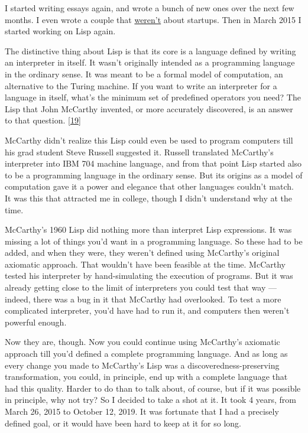 I started writing essays again, and wrote a bunch of new ones over the
next few months. I even wrote a couple that \href{know.html}{weren't}
about startups. Then in March 2015 I started working on Lisp again.

The distinctive thing about Lisp is that its core is a language defined
by writing an interpreter in itself. It wasn't originally intended as a
programming language in the ordinary sense. It was meant to be a formal
model of computation, an alternative to the Turing machine. If you want
to write an interpreter for a language in itself, what's the minimum set
of predefined operators you need? The Lisp that John McCarthy invented,
or more accurately discovered, is an answer to that question.
{[}\hyperref[f19n]{19}{]}

McCarthy didn't realize this Lisp could even be used to program
computers till his grad student Steve Russell suggested it. Russell
translated McCarthy's interpreter into IBM 704 machine language, and
from that point Lisp started also to be a programming language in the
ordinary sense. But its origins as a model of computation gave it a
power and elegance that other languages couldn't match. It was this that
attracted me in college, though I didn't understand why at the time.

McCarthy's 1960 Lisp did nothing more than interpret Lisp expressions.
It was missing a lot of things you'd want in a programming language. So
these had to be added, and when they were, they weren't defined using
McCarthy's original axiomatic approach. That wouldn't have been feasible
at the time. McCarthy tested his interpreter by hand-simulating the
execution of programs. But it was already getting close to the limit of
interpreters you could test that way --- indeed, there was a bug in it
that McCarthy had overlooked. To test a more complicated interpreter,
you'd have had to run it, and computers then weren't powerful enough.

Now they are, though. Now you could continue using McCarthy's axiomatic
approach till you'd defined a complete programming language. And as long
as every change you made to McCarthy's Lisp was a
discoveredness-preserving transformation, you could, in principle, end
up with a complete language that had this quality. Harder to do than to
talk about, of course, but if it was possible in principle, why not try?
So I decided to take a shot at it. It took 4 years, from March 26, 2015
to October 12, 2019. It was fortunate that I had a precisely defined
goal, or it would have been hard to keep at it for so long.

